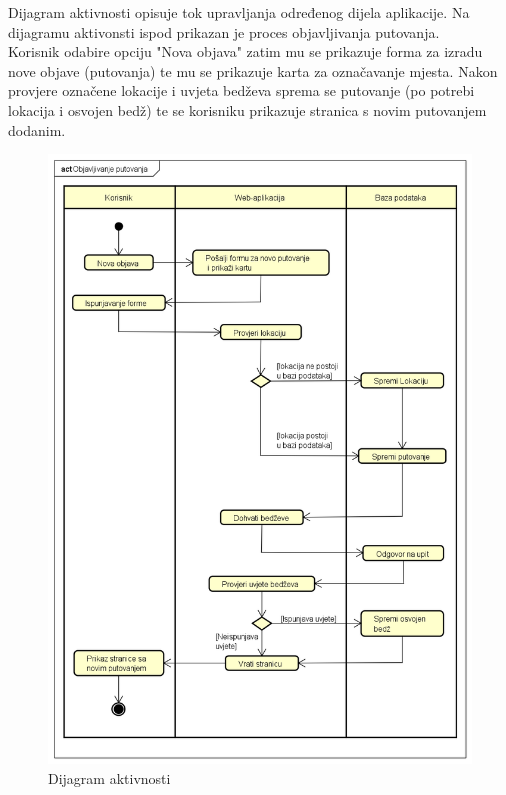 

            Dijagram aktivnosti opisuje tok upravljanja određenog dijela aplikacije. Na dijagramu aktivonsti ispod prikazan je proces objavljivanja putovanja.
            \\
            Korisnik odabire opciju "Nova objava" zatim mu se prikazuje forma za izradu nove objave (putovanja) te mu se prikazuje karta za označavanje mjesta. Nakon provjere označene lokacije i uvjeta bedževa sprema se putovanje (po potrebi lokacija i osvojen bedž) te se korisniku prikazuje stranica s novim putovanjem dodanim.

                \begin{figure}[H]
        		\includegraphics[scale=0.45]{slike/Dijagram aktivnosti - Objavljivanje putovanja.png} %
        		  \centering
        		\caption{Dijagram aktivnosti }

        	\end{figure}
         
